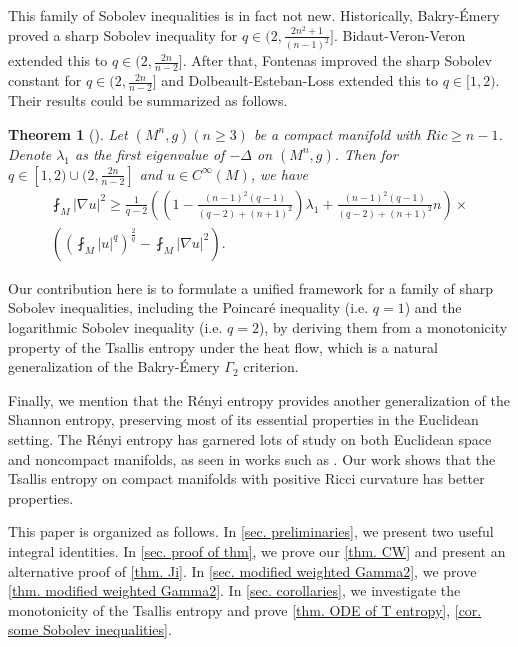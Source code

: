 \documentclass[11pt]{amsart}
\newtheorem{theorem}{Theorem}
\numberwithin{equation}{section}
\numberwithin{lemma}{section}
\numberwithin{proposition}{section}
\numberwithin{corollary}{section}
\numberwithin{remark}{section}
\begin{document}
 This family of Sobolev inequalities is in fact not new. Historically, Bakry-\'Emery \cite{BE85} proved a sharp Sobolev inequality for $q\in(2,\frac{2n^2+1}{(n-1)^2}]$. Bidaut-Veron-Veron \cite[Theorem 6.1]{BVV91} extended this to $q\in(2,\frac{2n}{n-2}]$.
After that, Fontenas \cite{Fon97} improved the sharp Sobolev constant for $q\in(2,\frac{2n}{n-2}]$ and Dolbeault-Esteban-Loss \cite[Theorem 4]{DEL14} extended this to $q\in [1,2)$. Their results could be summarized as follows.
\begin{theorem}[\cite{Fon97, DEL14}]\label{thm. DEL14}
    Let $(M^n,g) (n\geq 3)$ be a compact manifold with $Ric\geq n-1$.
    Denote $\lambda_1$ as the first eigenvalue of $-\Delta $ on $(M^n,g)$.
    Then for $q\in[1,2)\cup (2,\frac{2n}{n-2}]$ and $u\in C^{\infty}(M)$, we have
    \begin{align*}
    \fint_{M}|\nabla u|^2
    \geq 
    \frac{1}{q-2}
    \left(\left(1-\frac{(n-1)^2(q-1)}{(q-2)+(n+1)^2}\right)\lambda_1
    +\frac{(n-1)^2(q-1)}{(q-2)+(n+1)^2} n \right)\times\\
    \left(
    \left(\fint_{M}|u|^{q}\right)^{\frac{2}{q}}
    -\fint_{M}|\nabla u|^2
    \right).
    \end{align*}
\end{theorem}

Our contribution here is to formulate a unified framework for a family of sharp Sobolev inequalities, including the Poincar\'e inequality (i.e. $q=1$) and the logarithmic Sobolev inequality (i.e. $q=2$), by deriving them from a monotonicity property of the Tsallis entropy under the heat flow, which is a natural generalization of the Bakry-\'Emery $\Gamma_2$ criterion.

Finally, we mention that the R\'enyi entropy \cite{Ren61} provides another generalization of the Shannon entropy, preserving most of its essential properties in the Euclidean setting. The R\'enyi entropy has garnered lots of study on both Euclidean space and noncompact manifolds, as seen in works such as \cite{Raj12,ST14, Kel16, Bra23, Sug25}.
Our work shows that the Tsallis entropy on compact manifolds with positive Ricci curvature has better properties.

    This paper is organized as follows. 
    In \cref{sec. preliminaries}, we present two useful integral identities. 
    In \cref{sec. proof of thm}, we prove our \cref{thm. CW} and present an alternative proof of \cref{thm. Ji}. 
    In \cref{sec. modified weighted Gamma2}, we prove \cref{thm. modified weighted Gamma2}.
    In \cref{sec. corollaries}, we investigate the monotonicity of the Tsallis entropy and prove \cref{thm. ODE of T entropy}, \cref{cor. some Sobolev inequalities}.
    
\end{document}
